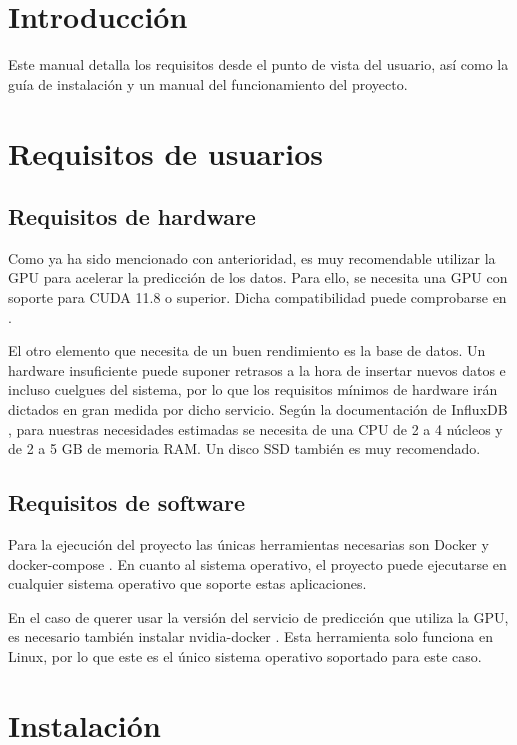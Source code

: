 
\section{Introducción}

Este manual detalla los requisitos desde el punto de vista del usuario, así como la guía de instalación y 
un manual del funcionamiento del proyecto.

\section{Requisitos de usuarios}

\subsection*{Requisitos de hardware}
Como ya ha sido mencionado con anterioridad, es muy recomendable utilizar la GPU para acelerar la predicción de 
los datos. Para ello, se necesita una GPU con soporte para CUDA 11.8 o superior. Dicha compatibilidad puede
comprobarse en \cite{cuda-compatibility}.

El otro elemento que necesita de un buen rendimiento es la base de datos. Un hardware insuficiente puede suponer 
retrasos a la hora de insertar nuevos datos e incluso cuelgues del sistema, por lo que los requisitos mínimos de 
hardware irán dictados en gran medida por dicho servicio. Según la documentación de InfluxDB \cite{influx:requirements}, para nuestras necesidades 
estimadas se necesita de una CPU de 2 a 4 núcleos y de 2 a 5 GB de memoria RAM. Un disco SSD también es muy recomendado.

\subsection*{Requisitos de software}
Para la ejecución del proyecto las únicas herramientas necesarias son Docker \cite{docker-pag} y docker-compose \cite{compose}.
En cuanto al sistema operativo, el proyecto puede ejecutarse en cualquier sistema operativo que soporte estas aplicaciones.

En el caso de querer usar la versión del servicio de predicción que utiliza la GPU, es necesario también instalar 
nvidia-docker \cite{nvidia-docker}. Esta herramienta solo funciona en Linux, por lo que este es el único sistema 
operativo soportado para este caso.

\section{Instalación}

